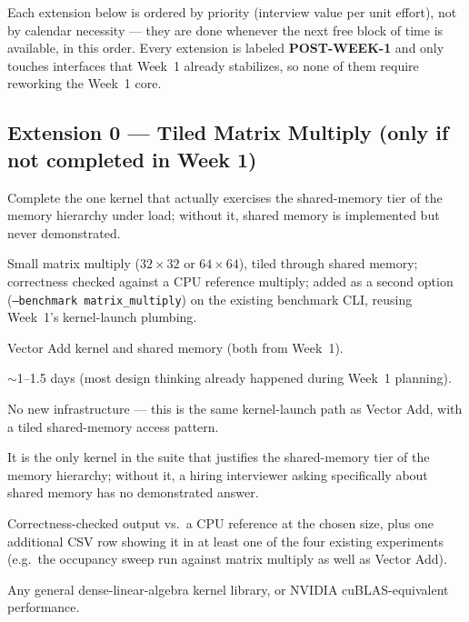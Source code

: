 \documentclass[11pt]{article}
\newcommand{\postweek}{\textcolor{steel}{\textbf{POST-WEEK-1}}}
\begin{document}
Each extension below is ordered by priority (interview value per unit
effort), not by calendar necessity --- they are done whenever the next
free block of time is available, in this order. Every extension is
labeled \postweek{} and only touches interfaces that Week~1 already
stabilizes, so none of them require reworking the Week~1 core.

\subsection{Extension 0 --- Tiled Matrix Multiply (only if not completed
in Week 1)}
\label{sec:ext0}

\begin{description}[leftmargin=1.2cm]
  \item[Purpose] Complete the one kernel that actually exercises the
  shared-memory tier of the memory hierarchy under load; without it,
  shared memory is implemented but never demonstrated.
  \item[Implementation] Small matrix multiply ($32\times32$ or
  $64\times64$), tiled through shared memory; correctness checked against
  a CPU reference multiply; added as a second option
  (\texttt{--benchmark matrix\_multiply}) on the existing benchmark CLI,
  reusing Week~1's kernel-launch plumbing.
  \item[Dependencies] Vector Add kernel and shared memory (both from
  Week~1).
  \item[Estimated effort] $\sim$1--1.5 days (most design thinking already
  happened during Week~1 planning).
  \item[Design notes] No new infrastructure --- this is the same
  kernel-launch path as Vector Add, with a tiled shared-memory access
  pattern.
  \item[Why it matters] It is the only kernel in the suite that justifies
  the shared-memory tier of the memory hierarchy; without it, a hiring
  interviewer asking specifically about shared memory has no demonstrated
  answer.
  \item[Proof of done] Correctness-checked output vs.\ a CPU reference at
  the chosen size, plus one additional CSV row showing it in at least one
  of the four existing experiments (e.g.\ the occupancy sweep run against
  matrix multiply as well as Vector Add).
  \item[Does not claim] Any general dense-linear-algebra kernel library,
  or NVIDIA cuBLAS-equivalent performance.
\end{description}
\end{document}
